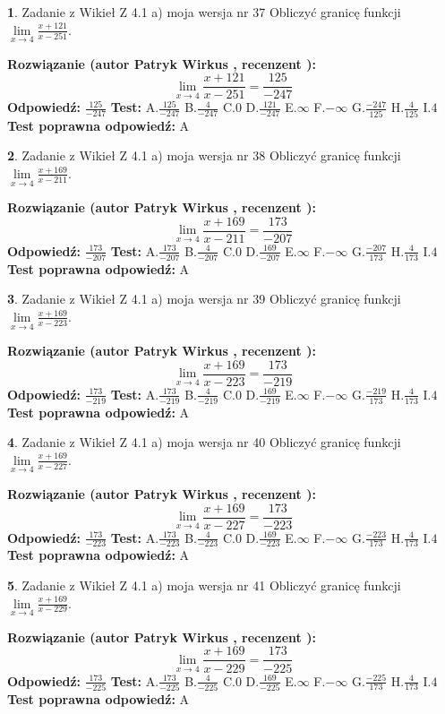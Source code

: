 \documentclass[12pt, a4paper]{article}
\theoremstyle{definition} %
\newtheorem{zad}{}
\newcommand{\zadStart}[1]{\begin{zad}#1\newline}
\newcommand{\zadStop}{\end{zad}}
\newcommand{\rozwStart}[2]{\noindent \textbf{Rozwiązanie (autor #1 , recenzent #2): }\newline}
\newcommand{\rozwStop}{\newline}
\newcommand{\odpStart}{\noindent \textbf{Odpowiedź:}\newline}
\newcommand{\odpStop}{\newline}
\newcommand{\testStart}{\noindent \textbf{Test:}\newline}
\newcommand{\testStop}{\newline}
\newcommand{\kluczStart}{\noindent \textbf{Test poprawna odpowiedź:}\newline}
\newcommand{\kluczStop}{\newline}
\begin{document}
\zadStart{Zadanie z Wikieł Z 4.1 a) moja wersja nr 37}
Obliczyć granicę funkcji $\lim\limits_{x\to4}\frac{x+121}{x-251}$.
\zadStop
\rozwStart{Patryk Wirkus}{}
$$\lim\limits_{x\to4}\frac{x+121}{x-251} = \frac{125}{-247}$$
\rozwStop
\odpStart
$\frac{125}{-247}$
\odpStop
\testStart
A.$\frac{125}{-247}$
B.$\frac{4}{-247}$
C.$0$
D.$\frac{121}{-247}$
E.$\infty$
F.$-\infty$
G.$\frac{-247}{125}$
H.$\frac{4}{125}$
I.$4$
\testStop
\kluczStart
A
\kluczStop



\zadStart{Zadanie z Wikieł Z 4.1 a) moja wersja nr 38}
Obliczyć granicę funkcji $\lim\limits_{x\to4}\frac{x+169}{x-211}$.
\zadStop
\rozwStart{Patryk Wirkus}{}
$$\lim\limits_{x\to4}\frac{x+169}{x-211} = \frac{173}{-207}$$
\rozwStop
\odpStart
$\frac{173}{-207}$
\odpStop
\testStart
A.$\frac{173}{-207}$
B.$\frac{4}{-207}$
C.$0$
D.$\frac{169}{-207}$
E.$\infty$
F.$-\infty$
G.$\frac{-207}{173}$
H.$\frac{4}{173}$
I.$4$
\testStop
\kluczStart
A
\kluczStop



\zadStart{Zadanie z Wikieł Z 4.1 a) moja wersja nr 39}
Obliczyć granicę funkcji $\lim\limits_{x\to4}\frac{x+169}{x-223}$.
\zadStop
\rozwStart{Patryk Wirkus}{}
$$\lim\limits_{x\to4}\frac{x+169}{x-223} = \frac{173}{-219}$$
\rozwStop
\odpStart
$\frac{173}{-219}$
\odpStop
\testStart
A.$\frac{173}{-219}$
B.$\frac{4}{-219}$
C.$0$
D.$\frac{169}{-219}$
E.$\infty$
F.$-\infty$
G.$\frac{-219}{173}$
H.$\frac{4}{173}$
I.$4$
\testStop
\kluczStart
A
\kluczStop



\zadStart{Zadanie z Wikieł Z 4.1 a) moja wersja nr 40}
Obliczyć granicę funkcji $\lim\limits_{x\to4}\frac{x+169}{x-227}$.
\zadStop
\rozwStart{Patryk Wirkus}{}
$$\lim\limits_{x\to4}\frac{x+169}{x-227} = \frac{173}{-223}$$
\rozwStop
\odpStart
$\frac{173}{-223}$
\odpStop
\testStart
A.$\frac{173}{-223}$
B.$\frac{4}{-223}$
C.$0$
D.$\frac{169}{-223}$
E.$\infty$
F.$-\infty$
G.$\frac{-223}{173}$
H.$\frac{4}{173}$
I.$4$
\testStop
\kluczStart
A
\kluczStop



\zadStart{Zadanie z Wikieł Z 4.1 a) moja wersja nr 41}
Obliczyć granicę funkcji $\lim\limits_{x\to4}\frac{x+169}{x-229}$.
\zadStop
\rozwStart{Patryk Wirkus}{}
$$\lim\limits_{x\to4}\frac{x+169}{x-229} = \frac{173}{-225}$$
\rozwStop
\odpStart
$\frac{173}{-225}$
\odpStop
\testStart
A.$\frac{173}{-225}$
B.$\frac{4}{-225}$
C.$0$
D.$\frac{169}{-225}$
E.$\infty$
F.$-\infty$
G.$\frac{-225}{173}$
H.$\frac{4}{173}$
I.$4$
\testStop
\kluczStart
A
\kluczStop
\end{document}
